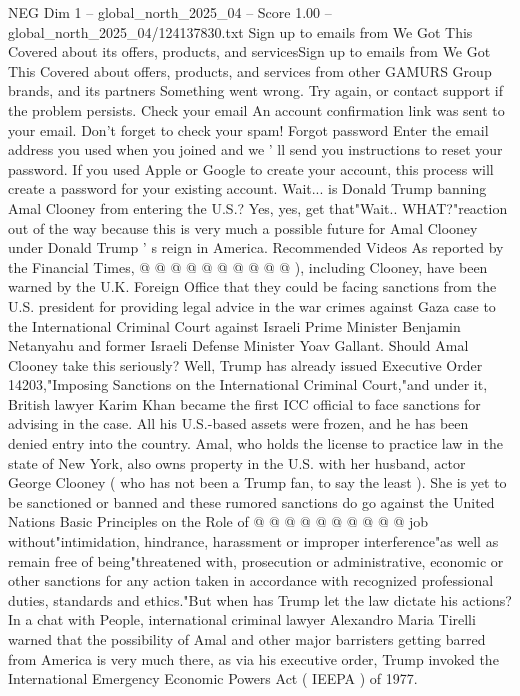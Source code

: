 \begin{textsample}{NEG Dim 1 – global\_north\_2025\_04 – Score 1.00 – global\_north\_2025\_04/124137830.txt}  \label{ex:f1_neg_105}
Sign up to emails from We Got This Covered about its offers, products, and servicesSign up to emails from We Got This Covered about offers, products, and services from other GAMURS Group brands, and its partners Something went wrong.
Try again, or contact support if the problem persists.
Check your email An account confirmation link was sent to your email.
Don't forget to check your spam!
Forgot password Enter the email address you used when you joined and we ' ll send you instructions to reset your password.
If you used Apple or Google to create your account, this process will create a password for your existing account.
Wait... is Donald Trump banning Amal Clooney from entering the U.S.?
Yes, yes, get that"Wait..
WHAT?"reaction out of the way because this is very much a possible future for Amal Clooney under Donald Trump ' s reign in America.
Recommended Videos As reported by the Financial Times, @ @ @ @ @ @ @ @ @ @ ), including Clooney, have been warned by the U.K.
Foreign Office that they could be facing sanctions from the U.S. president for providing legal advice in the war crimes against Gaza case to the International Criminal Court against Israeli Prime Minister Benjamin Netanyahu and former Israeli Defense Minister Yoav Gallant.
Should Amal Clooney take this seriously?
Well, Trump has already issued Executive Order 14203,"Imposing Sanctions on the International Criminal Court,"and under it, British lawyer Karim Khan became the first ICC official to face sanctions for advising in the case.
All his U.S.-based assets were frozen, and he has been denied entry into the country.
Amal, who holds the license to practice law in the state of New York, also owns property in the U.S. with her husband, actor George Clooney ( who has not been a Trump fan, to say the least ).
She is yet to be sanctioned or banned and these rumored sanctions do go against the United Nations Basic Principles on the Role of @ @ @ @ @ @ @ @ @ @ job without"intimidation, hindrance, harassment or improper interference"as well as remain free of being"threatened with, prosecution or administrative, economic or other sanctions for any action taken in accordance with recognized professional duties, standards and ethics."But when has Trump let the law dictate his actions?
In a chat with People, international criminal lawyer Alexandro Maria Tirelli warned that the possibility of Amal and other major barristers getting barred from America is very much there, as via his executive order, Trump invoked the International Emergency Economic Powers Act ( IEEPA ) of 1977.

\end{textsample}
